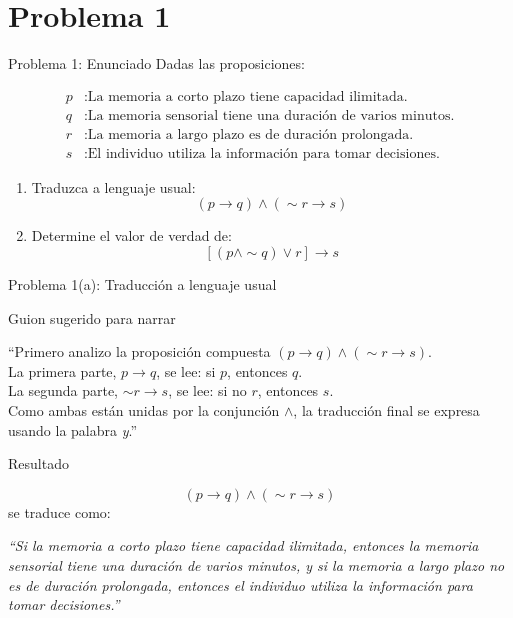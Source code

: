 \documentclass[aspectratio=169,10pt]{beamer}
\newcommand{\Guion}[1]{
	\begin{exampleblock}{Guion sugerido para narrar}
		#1
	\end{exampleblock}
}
\newcommand{\Resultado}[1]{
	\begin{block}{Resultado}
		#1
	\end{block}
}
\begin{document}
	\section{Problema 1}
	
	\begin{frame}{Problema 1: Enunciado}
		Dadas las proposiciones:
		
		\begin{align*}
			p &: \text{La memoria a corto plazo tiene capacidad ilimitada.} \\
			q &: \text{La memoria sensorial tiene una duración de varios minutos.} \\
			r &: \text{La memoria a largo plazo es de duración prolongada.} \\
			s &: \text{El individuo utiliza la información para tomar decisiones.}
		\end{align*}
		
		\begin{enumerate}[label=\alph*)]
			\item Traduzca a lenguaje usual:
			\[
			(p \to q)\land(\sim r \to s)
			\]
			\item Determine el valor de verdad de:
			\[
			[(p\land \sim q)\lor r]\to s
			\]
		\end{enumerate}
	\end{frame}
	
	\begin{frame}{Problema 1(a): Traducción a lenguaje usual}
		\Guion{
			``Primero analizo la proposición compuesta \((p\to q)\land(\sim r\to s)\).\\[0.2cm]
			La primera parte, \(p\to q\), se lee: si \(p\), entonces \(q\).\\
			La segunda parte, \(\sim r\to s\), se lee: si no \(r\), entonces \(s\).\\
			Como ambas están unidas por la conjunción \(\land\), la traducción final se expresa usando la palabra \textit{y}.''}
		
		\Resultado{
			\[
			(p\to q)\land(\sim r\to s)
			\]
			se traduce como:
			\vspace{0.2cm}
			
			\emph{``Si la memoria a corto plazo tiene capacidad ilimitada, entonces la memoria sensorial tiene una duración de varios minutos, y si la memoria a largo plazo no es de duración prolongada, entonces el individuo utiliza la información para tomar decisiones.''}
		}
	\end{frame}
	
\end{document}
